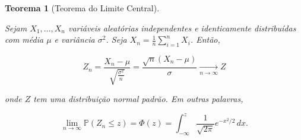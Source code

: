 \documentclass[
  letterpaper,
  DIV=11,
  numbers=noendperiod]{scrreprt}
\theoremstyle{definition}
\theoremstyle{plain}
\newtheorem{theorem}{Teorema}[chapter]
\theoremstyle{remark}
\begin{document}
\begin{theorem}[Teorema do Limite
Central]\protect\hypertarget{thm-limite-central}{}\label{thm-limite-central}

Sejam \(X_{1}, \ldots, X_{n}\) variáveis aleatórias independentes e
identicamente distribuídas com média \(\mu\) e variância \(\sigma^2\).
Seja \(X_n = \frac{1}{n} \sum_{i=1}^n X_i\). Então,

\[
Z_n = \frac{X_n - \mu}{\sqrt{\frac{\sigma^2}{n}}} = \frac{\sqrt{n}(X_n - \mu)}{\sigma} 
\xrightarrow[n \to \infty]{} Z
\]

onde \(Z\) tem uma distribuição normal padrão. Em outras palavras,

\[
\lim_{n \to \infty} \mathbb{P}(Z_n \leq z) = \Phi(z) = \int_{-\infty}^{z} \frac{1}{\sqrt{2 \pi}} e^{-x^2/2} \, dx.
\]

\end{theorem}
\end{document}
